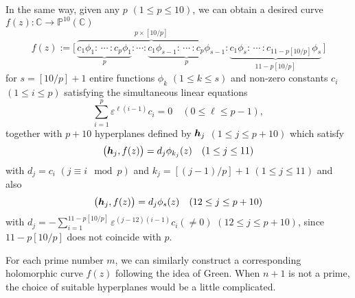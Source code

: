 \documentclass{amsart}
\theoremstyle{definition}
\numberwithin{equation}{section}
\numberwithin{theorem}{section}
\begin{document}
In the same way, given any $p$ $(1\leq p\leq 10)$, we can obtain a
desired curve $f(z):\mathbb{C}\to\mathbb{P}^{10}(\mathbb{C})$
$$
f(z):=\bigl[\, \overbrace{\underbrace{c_1\phi_1: \, \cdots \,
:c_{p}\phi_1}_{p}: \cdots : \underbrace{c_1\phi_{s-1}: \, \cdots
\, :c_{p}\phi_{s-1}}_{p}}^{p\times [10/p]}: \underbrace{c_1\phi_s:
\, \cdots \, :c_{11-p[10/p]}\phi_s}_{11-p[10/p]} \, \bigr]
$$
for $s=[10/p]+1$ entire functions $\phi_k$ $(1\leq k\leq s)$ and
non-zero constants $c_i$ $(1\leq i\leq p)$ satisfying the
simultaneous linear equations
$$
\sum_{i=1}^p \varepsilon^{\ell (i-1)}c_i=0 \quad (0\leq \ell \leq p-1),
$$
together with $p+10$ hyperplanes defined by
$\mbox{\boldmath$h$}_{j}$ $(1\leq j\leq p+10)$ which satisfy
$$
\bigl(\mbox{\boldmath$h$}_{j}, f(z)\bigr)=d_j\phi_{k_j}(z) \quad
(1\leq j\leq 11)
$$
with $d_j=c_i$ $(j\equiv i \mod p)$ and $k_j=[(j-1)/p]+1$ $(1\leq
j\leq 11)$ and also
$$
\bigl(\mbox{\boldmath$h$}_{j}, f(z)\bigr)= d_j\phi_{s}(z) \quad
(12\leq j\leq p+10)
$$
with $d_j=-\sum_{i=1}^{11-p[10/p]}
\varepsilon^{(j-12)(i-1)}c_i(\neq 0)$ $(12\leq j \leq p+10)$,
since $11-p[10/p]$ does not coincide with $p$.

For each prime number $m$, we can similarly construct a
corresponding holomorphic curve $f(z)$ following the idea of Green.
When $n+1$ is not a prime, the choice of suitable hyperplanes
would be a little complicated.
\end{document}
